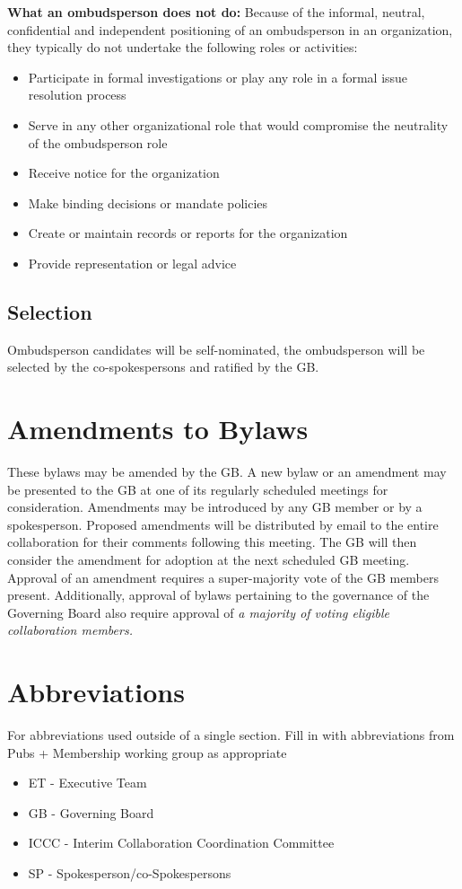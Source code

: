 \documentclass[12pt]{article}
\newcommand{\exec}{{Executive Team}}
\newcommand{\shorte}{{ET }}  %
\begin{document}
{\bf What an ombudsperson does not do:} Because of the informal, neutral, confidential and independent positioning of an ombudsperson
in an organization, they typically do not undertake the following roles or activities:
\begin{itemize}
\item Participate in formal investigations or play any role in a formal issue resolution process
\item Serve in any other organizational role that would compromise the neutrality of the
ombudsperson role
\item Receive notice for the organization
\item Make binding decisions or mandate policies
\item Create or maintain records or reports for the organization
\item Provide representation or legal advice

\end{itemize}

\subsection{Selection}
Ombudsperson candidates will be self-nominated, the ombudsperson will be selected by the co-spokespersons and ratified by the GB.

\section{Amendments to Bylaws}
\label{sec:amend}

These bylaws may be amended by the GB. A new bylaw or an amendment may be presented to the GB at one of its regularly scheduled meetings for consideration. Amendments may be introduced by any GB member or by a spokesperson. Proposed amendments will be distributed by email to the entire collaboration for their comments following this meeting. The GB will then consider the amendment for adoption at the next scheduled GB meeting. Approval of an amendment requires a super-majority vote of the GB members present. Additionally, approval of bylaws pertaining to the governance of the Governing Board also require approval of  {\it a majority of voting eligible collaboration members.}


\section*{Abbreviations} 
For abbreviations used outside of a single section. Fill in with abbreviations from Pubs + Membership working group as appropriate
\begin{itemize}
\item \shorte - \exec
\item GB - Governing Board
\item ICCC - Interim Collaboration Coordination Committee 
\item SP - Spokesperson/co-Spokespersons
\end{itemize}
\end{document}
